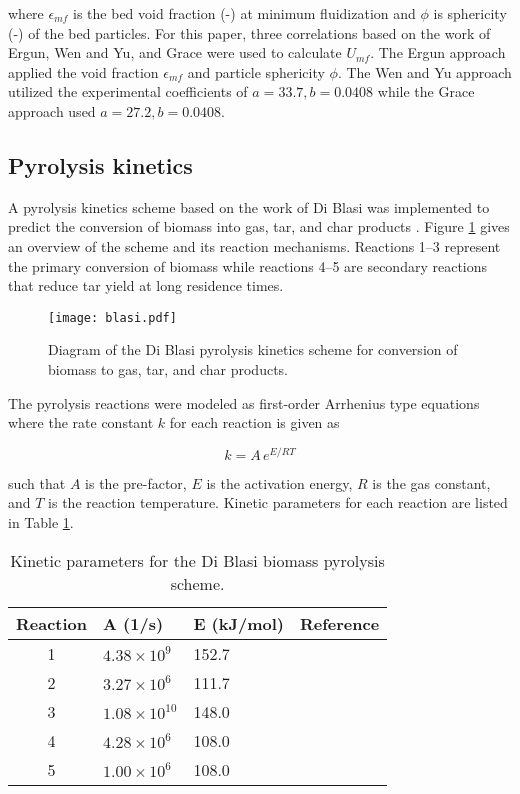 \noindent where $\epsilon_{mf}$ is the bed void fraction (-) at minimum fluidization and $\phi$ is sphericity (-) of the bed particles. For this paper, three correlations based on the work of Ergun, Wen and Yu, and Grace were used to calculate $U_{mf}$. The Ergun approach applied the void fraction $\epsilon_{mf}$ and particle sphericity $\phi$. The Wen and Yu approach utilized the experimental coefficients of $a = 33.7, b = 0.0408$ while the Grace approach used $a = 27.2, b = 0.0408$.

\subsection{Pyrolysis kinetics}

A pyrolysis kinetics scheme based on the work of Di Blasi was implemented to predict the conversion of biomass into gas, tar, and char products \cite{Blasi-1993,Blasi-2001}. Figure \ref{fig:blasi} gives an overview of the scheme and its reaction mechanisms. Reactions 1--3 represent the primary conversion of biomass while reactions 4--5 are secondary reactions that reduce tar yield at long residence times.

\begin{figure}[H]
    \centering
    \texttt{[image: blasi.pdf]}
    \caption{Diagram of the Di Blasi pyrolysis kinetics scheme for conversion of biomass to gas, tar, and char products.}
    \label{fig:blasi}
\end{figure}

The pyrolysis reactions were modeled as first-order Arrhenius type equations where the rate constant $k$ for each reaction is given as

\begin{equation}
    k = A\,e^{E / RT}
\end{equation}

\noindent such that $A$ is the pre-factor, $E$ is the activation energy, $R$ is the gas constant, and $T$ is the reaction temperature. Kinetic parameters for each reaction are listed in Table \ref{tab:kinetic-params}.

\begin{table}[H]
    \centering
    \caption{Kinetic parameters for the Di Blasi biomass pyrolysis scheme.}
    \begin{tabular}{cllc}
        \hline
        Reaction    & A (1/s)               & E (kJ/mol)    & Reference     \\
        \hline
        1           & $4.38 \times 10^9$    & 152.7         & \cite{Blasi-2001} \\
        2           & $3.27 \times 10^6$    & 111.7         & \cite{Blasi-2001} \\
        3           & $1.08 \times 10^{10}$ & 148.0         & \cite{Blasi-2001} \\
        4           & $4.28 \times 10^6$    & 108.0         & \cite{Blasi-1993} \\
        5           & $1.00 \times 10^6$    & 108.0         & \cite{Blasi-1993} \\
        \hline
    \end{tabular}
    \label{tab:kinetic-params}
\end{table}

